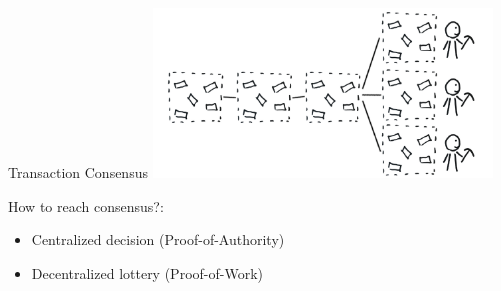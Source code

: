 \documentclass[handout]{beamer}
\begin{document}
\begin{frame}{Transaction Consensus}
\includegraphics[width=9cm]{../assets/images/consensus_problem.png}

How to reach consensus?: \\
	\begin{itemize}
	\item Centralized decision (Proof-of-Authority)
	\item \color{focus}Decentralized lottery (Proof-of-Work)
	\end{itemize}
\end{frame}
\end{document}
